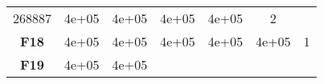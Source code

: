 \documentclass[12pt,a4paper]{article}
\begin{document}
\begin{longtable}[c]{@{}ccccccc@{}}
\begin{minipage}[t]{0.08\columnwidth}\centering\strut
268887
\strut\end{minipage} &
\begin{minipage}[t]{0.08\columnwidth}\centering\strut
4e+05
\strut\end{minipage} &
\begin{minipage}[t]{0.09\columnwidth}\centering\strut
4e+05
\strut\end{minipage} &
\begin{minipage}[t]{0.10\columnwidth}\centering\strut
4e+05
\strut\end{minipage} &
\begin{minipage}[t]{0.11\columnwidth}\centering\strut
4e+05
\strut\end{minipage} &
\begin{minipage}[t]{0.07\columnwidth}\centering\strut
2
\strut\end{minipage}\tabularnewline
\begin{minipage}[t]{0.11\columnwidth}\centering\strut
\textbf{F18}
\strut\end{minipage} &
\begin{minipage}[t]{0.08\columnwidth}\centering\strut
4e+05
\strut\end{minipage} &
\begin{minipage}[t]{0.08\columnwidth}\centering\strut
4e+05
\strut\end{minipage} &
\begin{minipage}[t]{0.09\columnwidth}\centering\strut
4e+05
\strut\end{minipage} &
\begin{minipage}[t]{0.10\columnwidth}\centering\strut
4e+05
\strut\end{minipage} &
\begin{minipage}[t]{0.11\columnwidth}\centering\strut
4e+05
\strut\end{minipage} &
\begin{minipage}[t]{0.07\columnwidth}\centering\strut
1
\strut\end{minipage}\tabularnewline
\begin{minipage}[t]{0.11\columnwidth}\centering\strut
\textbf{F19}
\strut\end{minipage} &
\begin{minipage}[t]{0.08\columnwidth}\centering\strut
4e+05
\strut\end{minipage} &
\begin{minipage}[t]{0.08\columnwidth}\centering\strut
4e+05
\strut\end{minipage} &

\end{longtable}
\end{document}
